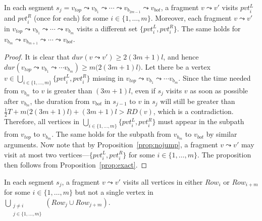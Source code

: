 \documentclass[envcountsame]{llncs}
\begin{document}
\begin{proposition}\label{prop:twopivots}
In each segment $s_j = v_{top} \leadsto v_{b_1} \leadsto \cdots \leadsto v_{b_{2m - 1}} \leadsto v_{bot}$,
a fragment $v \leadsto v'$ visits $\mathit{pvt}_i^L$ and $\mathit{pvt}_i^R$ (once for each) for some $i \in \{1, \ldots, m\}$.
Moreover, each fragment $v \leadsto v'$ in $v_{top} \leadsto v_{b_1} \leadsto \cdots \leadsto v_{b_m}$
visits a different set $\{\mathit{pvt}_i^L, \mathit{pvt}_i^R\}$.
The same holds for $v_{b_m} \leadsto v_{b_{m+1}} \leadsto \cdots \leadsto v_{bot}$.
\end{proposition}
\begin{proof}
It is clear that $\mathit{dur}(v \leadsto v') \geq 2(3m+1)l$,
and hence $\mathit{dur}(v_{top} \leadsto v_{b_1} \leadsto \cdots v_{b_m}) \geq m \big(2(3m+1)l\big)$.
Let there be a vertex \(v \in \bigcup_{i \in \{1, \ldots, m\}} \{\mathit{pvt}_i^L, \mathit{pvt}_i^R\}\)
missing in $v_{top} \leadsto v_{b_1} \leadsto \cdots v_{b_m}$.
Since the time needed from $v_{b_m}$ to $v$ is greater than $(3m+1)l$,
even if $s_j$ visits $v$ as soon as possible after $v_{b_m}$, 
the duration from $v_{bot}$ in $s_{j - 1}$ to $v$ in $s_j$ will still be greater than
$\frac{1}{2}T + m\big(2(3m+1)l\big) + (3m + 1)l > \mathit{RD}(v)$, which is a contradiction.
Therefore, all vertices in \( \bigcup_{i \in \{1, \ldots, m\}} \{\mathit{pvt}_i^L, \mathit{pvt}_i^R\} \) must appear in the subpath from $v_{top}$ to $v_{b_m}$.
The same holds for the subpath from $v_{b_m}$ to $v_{bot}$ by similar arguments.
Now note that by Proposition~\ref{prop:nojump}, a fragment $v \leadsto v'$ may visit
at most two vertices---$\{\mathit{pvt}_i^L, \mathit{pvt}_i^R\}$ for some $i \in \{1, \ldots, m\}$.
The proposition then follows from Proposition~\ref{prop:exact}.
\end{proof}

\begin{proposition}\label{prop:onerow}
In each segment $s_j$, a fragment $v \leadsto v'$
visits all vertices in either $\mathit{Row}_i$ or $\mathit{Row}_{i + m}$ for some $i \in \{1, \ldots, m\}$
but not a single vertex in $\bigcup_{\substack{j \neq i \\ j \in \{1, \ldots, m\}}} (\mathit{Row}_j \cup \mathit{Row}_{j + m})$.
\end{proposition}
\end{document}
